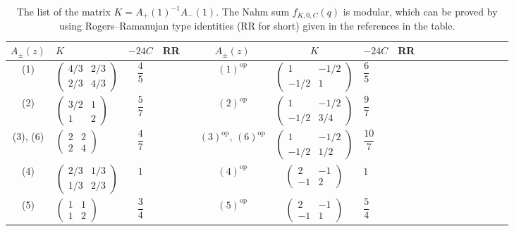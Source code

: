\documentclass[pdftex]{sigma}
\numberwithin{equation}{section}
\theoremstyle{definition}
\begin{document}
\begin{table}[t]
 \centering
 \begin{tabular}{Sl | Sl | Sc | Sl | Sl | Sl | Sl | Sc | Sl} \hline
 $A_\pm (z)$ & $K$ & $-24C$ & RR & &
 $A_\pm (z)$ & $K$ & $-24C$ & RR \\ \hline
 (1) &
 $\begin{pmatrix}
 4/3 & 2/3 \\
 2/3 & 4/3
 \end{pmatrix}$ &
 $\dfrac{4}{5}$ &
 \cite{CherednikFeigin} & &
 $\mathrm{(1)}^{\mathrm{op}}$ &
 $\begin{pmatrix}
 1 & - 1/2 \\
 - 1/2 & 1
 \end{pmatrix}$ &
 $\dfrac{6}{5}$ &
 \cite{VlasenkoZwegers} \\
 (2) &
 $\begin{pmatrix}
 3/2 & 1 \\
 1 & 2
 \end{pmatrix}$ &
 $\dfrac{5}{7}$ &
 \cite{wang2022rank2} & &
 $\mathrm{(2)}^{\mathrm{op}}$ &
 $\begin{pmatrix}
 1 & -1/2 \\
 -1/2 & 3/4
 \end{pmatrix}$ &
 $\dfrac{9}{7}$ &
 \cite{wang2022rank2} \\
 (3), (6) &
 $\begin{pmatrix}
 2 & 2 \\
 2 & 4
 \end{pmatrix}$ &
 $\dfrac{4}{7}$ &
 \cite{Andrews74} & &
 $\mathrm{(3)}^{\mathrm{op}}$,
 $\mathrm{(6)}^{\mathrm{op}}$ &
 $\begin{pmatrix}
 1 & -1/2 \\
 -1/2 & 1/2
 \end{pmatrix}$ &
 $\dfrac{10}{7}$ &
 \cite{wang2022rank2} \\
 (4) &
 $\begin{pmatrix}
 2/3 & 1/3 \\
 1/3 & 2/3
 \end{pmatrix}$ &
 $1$ &
 \cite{Zagier} & &
 $\mathrm{(4)}^{\mathrm{op}}$ &
 $\begin{pmatrix}
 2 & -1 \\
 -1 & 2
 \end{pmatrix}$ &
 $1$ &
 \cite{Zagier} \\
 (5) &
 $\begin{pmatrix}
 1 & 1 \\
 1 & 2
 \end{pmatrix}$ &
 $\dfrac{3}{4}$ &
 \cite{wang2022rank2} & &
 $\mathrm{(5)}^{\mathrm{op}}$ &
 $\begin{pmatrix}
 2 & -1 \\
 -1 & 1
 \end{pmatrix}$ &
 $\dfrac{5}{4}$ &
 \cite{CalinescuMilasPenn16} \\
 \hline
 \end{tabular}
 \caption{The list of the matrix $K = A_+(1)^{-1} A_- (1)$. The Nahm sum $f_{K,0,C}(q)$ is modular,
 which can be proved by using Rogers--Ramanujan type identities (RR for short) given in the references
 in the table.} \label{table:Nahm sum}
\end{table}
\end{document}
